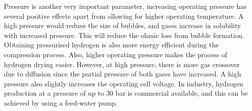 \documentclass[11pt, a4paper]{article}
\begin{document}
Pressure is another very important parameter, increasing operating pressure has several positive effects apart from allowing for higher operating temperature.  A high pressure would reduce the size of bubbles, and gases increase in solubility with increased pressure. This will reduce the ohmic loss from bubble formation. Obtaining pressurised hydrogen is also more energy efficient during the compression process. Also, higher operating pressure makes the process of hydrogen drying easier. However, at high pressure, there is more gas crossover due to diffusion since the partial pressure of both gases have increased. A high pressure also slightly increases the operating cell voltage. In industry, 
hydrogen production at a pressure of up to 30 bar is  commercial available, and this can be achieved by using a feed-water pump.\cite{gibbs}
\end{document}

